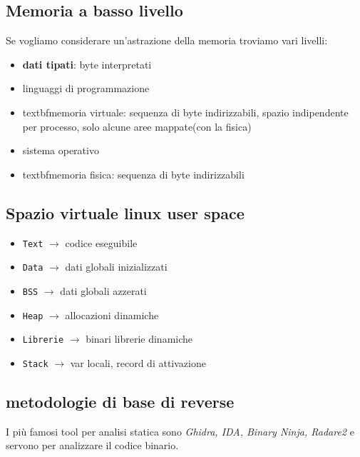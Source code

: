 \documentclass[oneside,a4paper,11pt]{book}
\theoremstyle{italicstyle}
\theoremstyle{normStyle}
\begin{document}
\subsection{Memoria a basso livello}
Se vogliamo considerare un'astrazione della memoria troviamo vari livelli:
 \begin{itemize}
  \item \textbf{dati tipati}: byte interpretati
  \item linguaggi di programmazione
    \item textbf{memoria virtuale}: sequenza di byte indirizzabili, spazio indipendente per processo, solo alcune aree mappate(con la fisica)
    \item sistema operativo
    \item textbf{memoria fisica}: sequenza di byte indirizzabili
\end{itemize}

\subsection{Spazio virtuale linux user space}

\begin{itemize}
    \item \texttt{Text} $\rightarrow$ codice eseguibile
    \item \texttt{Data} $\rightarrow$ dati globali inizializzati
    \item \texttt{BSS} $\rightarrow$ dati globali azzerati
    \item \texttt{Heap} $\rightarrow$ allocazioni dinamiche
    \item \texttt{Librerie} $\rightarrow$ binari librerie dinamiche
    \item \texttt{Stack} $\rightarrow$ var locali, record di attivazione
\end{itemize}

\subsection{metodologie di base di reverse}
I più famosi tool per analisi statica sono
\textit{Ghidra, IDA, Binary Ninja,
Radare2} e servono per analizzare il codice binario. 
\end{document}
